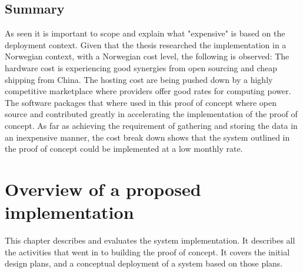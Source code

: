 \documentclass[]{uiophd}
\begin{document}
\section{Summary}
As seen it is important to scope and explain what "expensive" is based on the deployment context. Given that the thesis researched the implementation in a Norwegian context, with a Norwegian cost level, the following is observed: The hardware cost is experiencing good synergies from open sourcing and cheap shipping from China. The hosting cost are being pushed down by a highly competitive marketplace where providers offer good rates for computing power. The software packages that where used in this proof of concept where open source and contributed greatly in accelerating the implementation of the proof of concept. As far as achieving the requirement of gathering and storing the data in an inexpensive manner, the cost break down shows that the system outlined in the proof of concept could be implemented at a low monthly rate.


\chapter{Overview of a proposed implementation}

This chapter describes and evaluates the system implementation. It describes all the activities that went in to building the proof of concept. It covers the initial design plans, and a conceptual deployment of a system based on those plans.
\end{document}
